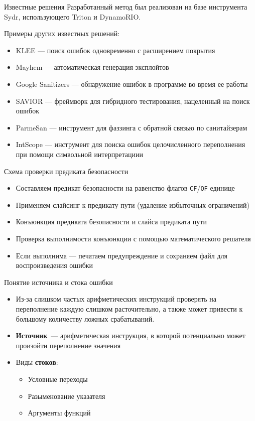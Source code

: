 \documentclass[10pt]{beamer}
\begin{document}
\begin{frame}{Известные решения}
Разработанный метод был реализован на базе инструмента Sydr, использующего
Triton и DynamoRIO.

Примеры других известных решений:
\begin{itemize}
    \item KLEE --- поиск ошибок одновременно с расширением покрытия
    \item Mayhem --- автоматическая генерация эксплойтов
    \item Google Sanitizers --- обнаружение ошибок в программе
        во время ее работы
    \item SAVIOR --- фреймворк для гибридного тестирования, нацеленный на поиск
        ошибок
    \item ParmeSan --- инструмент для фаззинга с обратной связью по санитайзерам
    \item IntScope --- инструмент для поиска ошибок целочисленного переполнения
        при помощи символьной интерпретациии
\end{itemize}
\end{frame}

\begin{frame}{Схема проверки предиката безопасности}
\begin{itemize}
    \item Составляем предикат безопасности на равенство флагов
        \texttt{CF}/\texttt{OF} единице
    \item Применяем слайсинг к предикату пути (удаление избыточных ограничений)
    \item Конъюнкция предиката безопасности и слайса предиката пути
    \item Проверка выполнимости конъюнкции с помощью математического решателя
    \item Если выполнима --- печатаем предупреждение и сохраняем файл
        для воспроизведения ошибки
\end{itemize}
\end{frame}

\begin{frame}{Понятие источника и стока ошибки}
\begin{itemize}
    \item Из-за слишком частых арифметических инструкций проверять на
        переполнение каждую слишком расточительно, а также может привести к
        большому количеству ложных срабатываний.
    \item \textbf{Источник}~--- арифметическая инструкция, в которой потенциально
        может произойти переполнение значения
    \item Виды \textbf{стоков}:
        \begin{itemize}
            \item Условные переходы
            \item Разыменование указателя
            \item Аргументы функций
        \end{itemize}
\end{itemize}
\end{frame}
\end{document}
